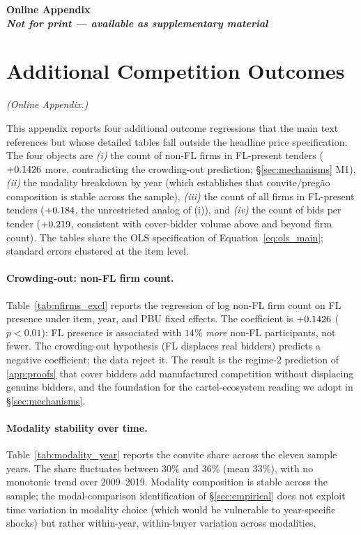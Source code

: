 \clearpage
\begin{center}
\Large\bfseries Online Appendix\\[6pt]
\large\itshape Not for print --- available as supplementary material
\end{center}
\bigskip

\section{Additional Competition Outcomes}
\label{app:online_competition}
\noindent\textit{(Online Appendix.)}\medskip

This appendix reports four additional outcome regressions that
the main text references but whose detailed tables fall outside
the headline price specification. The four objects are
\emph{(i)} the count of non-FL firms in FL-present tenders
($+0.1426$ more, contradicting the crowding-out prediction;
\S\ref{sec:mechanisms} M1), \emph{(ii)} the modality
breakdown by year (which establishes that
convite/preg\~ao composition is stable across the sample),
\emph{(iii)} the count of all firms in FL-present tenders
($+0.184$, the unrestricted analog of (i)), and
\emph{(iv)} the count of bids per tender ($+0.219$, consistent
with cover-bidder volume above and beyond firm count). The
tables share the OLS specification of
Equation~\eqref{eq:ols_main}; standard errors clustered at the
item level.

\paragraph{Crowding-out: non-FL firm count.}
Table~\ref{tab:nfirms_excl} reports the regression of log
non-FL firm count on FL presence under item, year, and PBU
fixed effects. The coefficient is $+0.1426$ ($p < 0.01$): FL
presence is associated with $14\%$ \emph{more} non-FL
participants, not fewer. The crowding-out hypothesis (FL
displaces real bidders) predicts a negative coefficient; the
data reject it. The result is the regime-2 prediction of
\ref{app:proofs} that cover bidders add manufactured
competition without displacing genuine bidders, and the
foundation for the cartel-ecosystem reading we adopt in
\S\ref{sec:mechanisms}.



\paragraph{Modality stability over time.}
Table~\ref{tab:modality_year} reports the convite share
across the eleven sample years. The share fluctuates between
$30\%$ and $36\%$ (mean $33\%$), with no monotonic trend over
2009--2019. Modality composition is stable across the sample;
the modal-comparison identification of \S\ref{sec:empirical}
does not exploit time variation in modality choice (which
would be vulnerable to year-specific shocks) but rather
within-year, within-buyer variation across modalities.

